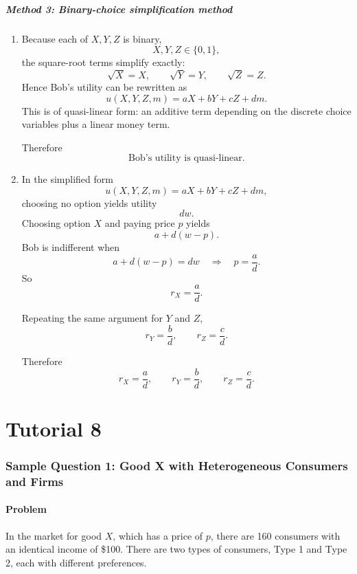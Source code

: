 \documentclass[12pt]{article}
\begin{document}
\subsubsection{Method 3: Binary-choice simplification method}
\begin{enumerate}[label=(\alph*)]
    \item
    Because each of \(X,Y,Z\) is binary,
    \[
    X,Y,Z\in\{0,1\},
    \]
    the square-root terms simplify exactly:
    \[
    \sqrt{X}=X,\qquad \sqrt{Y}=Y,\qquad \sqrt{Z}=Z.
    \]
    Hence Bob’s utility can be rewritten as
    \[
    u(X,Y,Z,m)=aX+bY+cZ+dm.
    \]
    This is of quasi-linear form: an additive term depending on the discrete choice variables plus a linear money term.

    Therefore
    \[
    \boxed{\text{Bob’s utility is quasi-linear.}}
    \]

    \item
    In the simplified form
    \[
    u(X,Y,Z,m)=aX+bY+cZ+dm,
    \]
    choosing no option yields utility
    \[
    dw.
    \]
    Choosing option \(X\) and paying price \(p\) yields
    \[
    a+d(w-p).
    \]
    Bob is indifferent when
    \[
    a+d(w-p)=dw
    \quad\Longrightarrow\quad
    p=\frac{a}{d}.
    \]
    So
    \[
    \boxed{r_X=\frac{a}{d}.}
    \]

    Repeating the same argument for \(Y\) and \(Z\),
    \[
    \boxed{r_Y=\frac{b}{d},\qquad r_Z=\frac{c}{d}.}
    \]

    Therefore
    \[
    \boxed{
    r_X=\frac{a}{d},\qquad
    r_Y=\frac{b}{d},\qquad
    r_Z=\frac{c}{d}.
    }
    \]
\end{enumerate}

\newpage
\part{Tutorial 8}
\section{Sample Question 1: Good X with Heterogeneous Consumers and Firms}

\subsection{Problem}

\noindent
In the market for good \(X\), which has a price of \(p\), there are 160 consumers with an identical income of \$100. There are two types of consumers, Type 1 and Type 2, each with different preferences.
\end{document}
